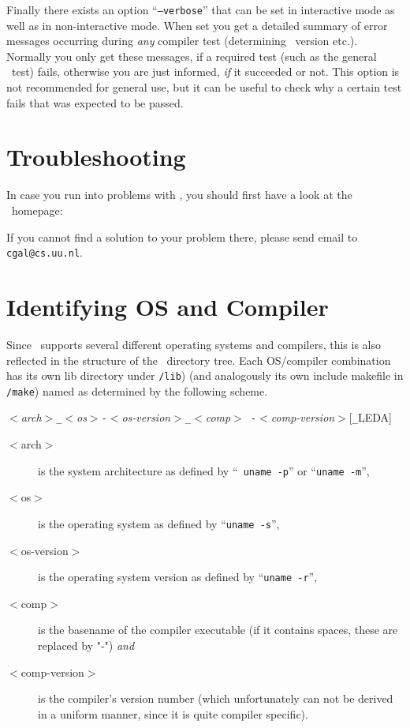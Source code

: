 Finally there exists an option ``\texttt{--verbose}'' that can be set
in interactive mode as well as in non-interactive mode. When set you
get a detailed summary of error messages occurring during \textit{any}
compiler test (determining \stl\ version etc.). Normally you only get
these messages, if a required test (such as the general \stl\ test)
fails, otherwise you are just informed, \textit{if} it succeeded or
not.  This option is not recommended for general use, but it can be
useful to check why a certain test fails that was expected to be
passed.

\section{Troubleshooting}\label{sec:troubleshooting}

In case you run into problems with \cgal, you should first have a look
at the \cgal\ homepage:
\begin{alltt}
\cgalhomepage
\end{alltt}
If you cannot find a solution to your problem there, please send email
to \texttt{cgal@cs.uu.nl}.

\section{Identifying OS and Compiler}\label{sec:os-compiler-id}

Since \cgal\ supports several different operating systems and
compilers, this is also reflected in the structure of the \cgal\ 
directory tree. Each OS/compiler combination has its own lib directory
under \texttt{\cgaldir/lib}) (and analogously its own include makefile
in \texttt{\cgaldir/make}) named as determined by the following
scheme.
\begin{center}
  \textit{$<$arch$>$\texttt{\_}$<$os$>$\texttt{-}$<$os-version$>$\texttt{\_}$<$comp$>${\tt
    -}$<$comp-version$>$}[\texttt{\_}LEDA]
\end{center}

\begin{description}
\item[$<$arch$>$] is the system architecture as defined by ``{\tt
    uname -p}'' or ``\texttt{uname -m}'',
\item[$<$os$>$] is the operating system as defined by ``\texttt{uname
    -s}'',
\item[$<$os-version$>$] is the operating system version as defined by
  ``\texttt{uname -r}'',
\item[$<$comp$>$] is the basename of the compiler executable (if it
  contains spaces, these are replaced by "-") \textit{and}
\item[$<$comp-version$>$] is the compiler's version number (which
  unfortunately can not be derived in a uniform manner, since it is
  quite compiler specific).
\end{description}

